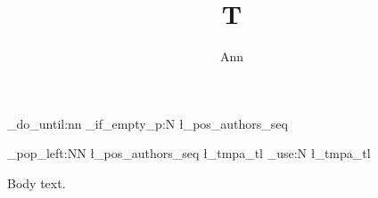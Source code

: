 \documentclass{article}
\title{T}
\author{Ann}
\makeatletter
\renewcommand\maketitle{\begin{center}{\LARGE\@title\par}
  \bool_do_until:nn {\seq_if_empty_p:N \l_pos_authors_seq}
    {\seq_pop_left:NN \l_pos_authors_seq \l_tmpa_tl \tl_use:N \l_tmpa_tl \par}
  \end{center}}
\makeatother
\begin{document}
\maketitle
Body text.
\end{document}
